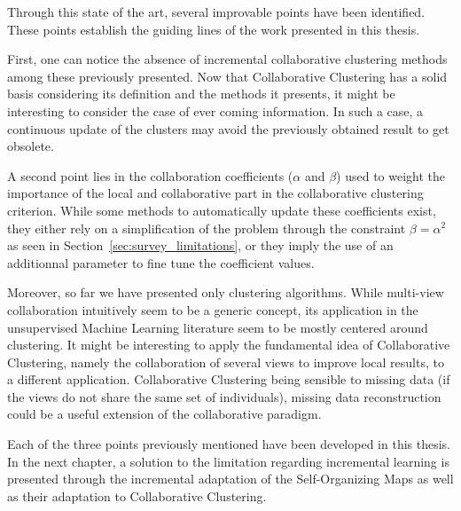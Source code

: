     Through this state of the art, several improvable points have been identified. These points establish the guiding lines of the work presented in this thesis.

    First, one can notice the absence of incremental collaborative clustering methods among these previously presented. Now that Collaborative Clustering has a solid basis considering its definition and the methods it presents, it might be interesting to consider the case of ever coming information. In such a case, a continuous update of the clusters may avoid the previously obtained result to get obsolete.

    A second point lies in the collaboration coefficients ($\alpha$ and $\beta$) used to weight the importance of the local and collaborative part in the collaborative clustering criterion. While some methods to automatically update these coefficients exist, they either rely on a simplification of the problem through the constraint $\beta = \alpha^2$ as seen in Section~\ref{sec:survey_limitations}, or they imply the use of an additionnal parameter to fine tune the coefficient values.

    Moreover, so far we have presented only clustering algorithms. While multi-view collaboration intuitively seem to be a generic concept, its application in the unsupervised Machine Learning literature seem to be mostly centered around clustering. It might be interesting to apply the fundamental idea of Collaborative Clustering, namely the collaboration of several views to improve local results, to a different application. Collaborative Clustering being sensible to missing data (if the views do not share the same set of individuals), missing data reconstruction could be a useful extension of the collaborative paradigm.

    Each of the three points previously mentioned have been developed in this thesis. In the next chapter, a solution to the limitation regarding incremental learning is presented through the incremental adaptation of the Self-Organizing Maps as well as their adaptation to Collaborative Clustering.
